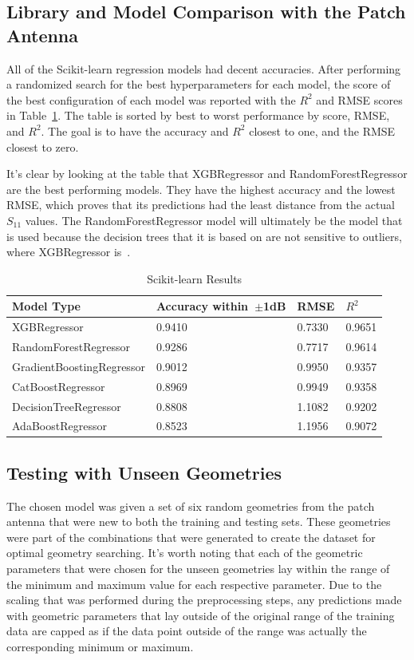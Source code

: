 \documentclass[conference]{IEEEtran}
\begin{document}
\subsection{Library and Model Comparison with the Patch Antenna}
All of the Scikit-learn regression models had decent accuracies. After performing a randomized search for the best hyperparameters for each model, the score of the best configuration of each model was reported with the $R^2$ and RMSE scores in Table~\ref{comparing_sklearn}. The table is sorted by best to worst performance by score, RMSE, and $R^2$. The goal is to have the accuracy and $R^2$ closest to one, and the RMSE closest to zero. 

It's clear by looking at the table that XGBRegressor and RandomForestRegressor are the best performing models. They have the highest accuracy and the lowest RMSE, which proves that its predictions had the least distance from the actual $S_{11}$ values. The RandomForestRegressor model will ultimately be the model that is used because the decision trees that it is based on are not sensitive to outliers, where XGBRegressor is~\cite{BROWN2009541,Li_2018}. 

\begin{table}[h]
\caption{Scikit-learn Results}
\begin{center}
\begin{tabular}{ |l|l|l|l| }
    \hline
    Model Type & Accuracy within~$\pm$1dB & RMSE & $R^2$ \\ 
    \hline
    XGBRegressor & 0.9410 & 0.7330 & 0.9651 \\  
    \hline
    RandomForestRegressor & 0.9286 & 0.7717 & 0.9614 \\
    \hline  
    GradientBoostingRegressor & 0.9012 & 0.9950 & 0.9357 \\
    \hline
    CatBoostRegressor & 0.8969 & 0.9949 & 0.9358 \\    
    \hline
    DecisionTreeRegressor & 0.8808 & 1.1082 & 0.9202 \\  
    \hline
    AdaBoostRegressor & 0.8523 & 1.1956 & 0.9072 \\  
    \hline
\end{tabular}
\end{center}
\label{comparing_sklearn}
\end{table}

\subsection{Testing with Unseen Geometries}
The chosen model was given a set of six random geometries from the patch antenna that were new to both the training and testing sets. These geometries were part of the combinations that were generated to create the dataset for optimal geometry searching. It's worth noting that each of the geometric parameters that were chosen for the unseen geometries lay within the range of the minimum and maximum value for each respective parameter. Due to the scaling that was performed during the preprocessing steps, any predictions made with geometric parameters that lay outside of the original range of the training data are capped as if the data point outside of the range was actually the corresponding minimum or maximum. 
\end{document}
